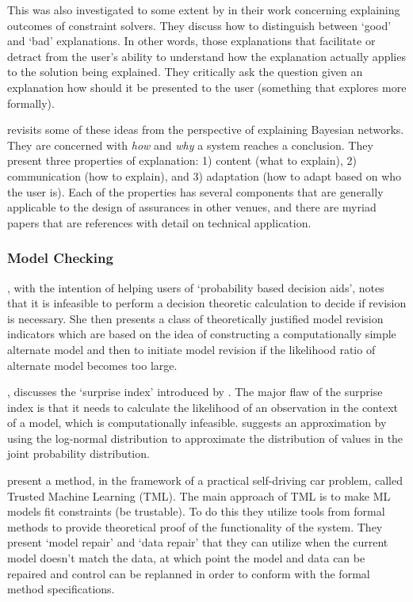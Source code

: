     This was also investigated to some extent by \citet{Wallace2001-fm} in their work concerning explaining outcomes of constraint solvers. They discuss how to distinguish between `good' and `bad' explanations. In other words, those explanations that facilitate or detract from the user's ability to understand how the explanation actually applies to the solution being explained. They critically ask the question given an explanation how should it be presented to the user (something that \citet{Kuhn1997-qc} explores more formally).

    \citet{Lacave2002-cu} revisits some of these ideas from the perspective of explaining Bayesian networks. They are concerned with \emph{how} and \emph{why} a system reaches a conclusion. They present three properties of explanation: 1) content (what to explain), 2) communication (how to explain), and 3) adaptation (how to adapt based on who the user is). Each of the properties has several components that are generally applicable to the design of assurances in other venues, and there are myriad papers that are references with detail on technical application.


\subsubsection{Model Checking}
    \citet{Laskey1991-mf}, with the intention of helping users of `probability based decision aids', notes that it is infeasible to perform a decision theoretic calculation to decide if revision is necessary. She then presents a class of theoretically justified model revision indicators which are based on the idea of constructing a computationally simple alternate model and then to initiate model revision if the likelihood ratio of alternate model becomes too large.

    \citet{Zagorecki2015-qy}, discusses the `surprise index' introduced by \citet{Habbema1976-xd}. The major flaw of the surprise index is that it needs to calculate the likelihood of an observation in the context of a model, which is computationally infeasible. \citeauthor{Zagorecki2015-qy} suggests an approximation by using the log-normal distribution to approximate the distribution of values in the joint probability distribution.

    \citet{Ghosh2016-dl} present a method, in the framework of a practical self-driving car problem, called Trusted Machine Learning (TML). The main approach of TML is to make ML models fit constraints (be trustable). To do this they utilize tools from formal methods to provide theoretical proof of the functionality of the system. They present `model repair' and `data repair' that they can utilize when the current model doesn't match the data, at which point the model and data can be repaired and control can be replanned in order to conform with the formal method specifications. 


